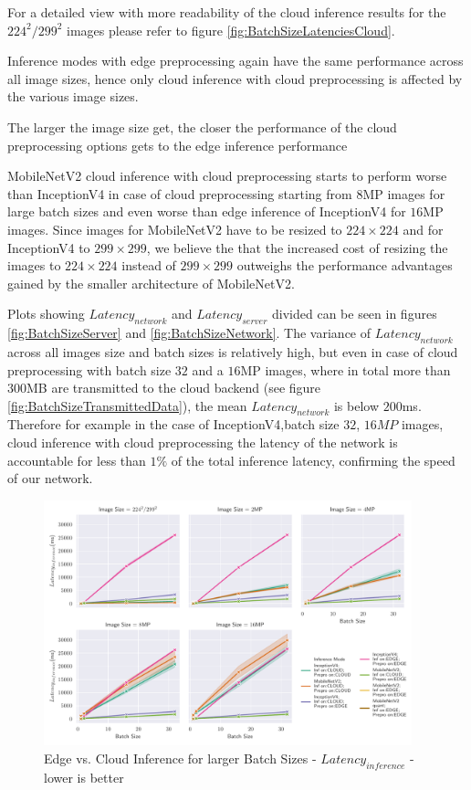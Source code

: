 For a detailed view with more readability of the cloud inference results for the $224^2/299^2$ images please refer to figure \ref{fig:BatchSizeLatenciesCloud}.

Inference modes with edge preprocessing again have the same performance across all image sizes, hence only cloud inference with cloud preprocessing is affected by the various image sizes.

The larger the image size get, the closer the performance of the cloud preprocessing options gets to the edge inference performance

MobileNetV2 cloud inference with cloud preprocessing starts to perform worse than InceptionV4 in case of cloud preprocessing starting from $8$MP images for large batch sizes and even worse than edge inference of InceptionV4 for $16$MP images.
Since images for MobileNetV2 have to be resized to $224\times224$ and for InceptionV4 to $299\times299$, we believe the that the increased cost of resizing the images to $224\times224$ instead of $299\times299$ outweighs the performance advantages gained by the smaller architecture of MobileNetV2.

Plots showing $Latency_{network}$ and $Latency_{server}$ divided can be seen in figures \ref{fig:BatchSizeServer} and \ref{fig:BatchSizeNetwork}.
The variance of $Latency_{network}$ across all images size and batch sizes is relatively high, but even in case of cloud preprocessing with batch size $32$ and a $16$MP images, where in total more than $300$MB are transmitted to the cloud backend (see figure \ref{fig:BatchSizeTransmittedData}), the mean $Latency_{network}$ is below $200$ms. 
Therefore for example in the case of InceptionV4,batch size $32$, $16MP$ images, cloud inference with cloud preprocessing the latency of the network is accountable for less than $1\%$ of the total inference latency, confirming the speed of our network.

\begin{figure}[!htb]
\centering
\includegraphics[width=0.95\textwidth]{./Bilder/single_plots/batch_size_plots/Effects_of_Batch_size_Inference_Latencies.pdf}
\caption{Edge vs. Cloud Inference for larger Batch Sizes -  $Latency_{inference}$ - lower is better}
\label{fig:BatchSizeInferenceLatency}
\end{figure}


